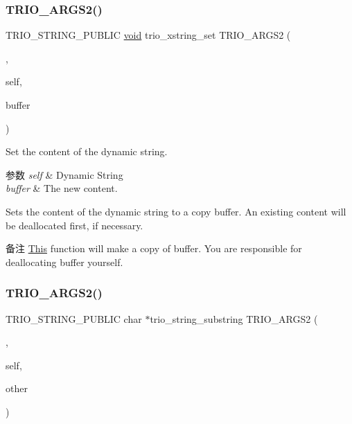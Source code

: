 \subsubsection{\texorpdfstring{T\+R\+I\+O\+\_\+\+A\+R\+G\+S2()}{TRIO\_ARGS2()}\hspace{0.1cm}{\footnotesize\ttfamily [2/3]}}
{\footnotesize\ttfamily T\+R\+I\+O\+\_\+\+S\+T\+R\+I\+N\+G\+\_\+\+P\+U\+B\+L\+IC \hyperlink{interfacevoid}{void} trio\+\_\+xstring\+\_\+set T\+R\+I\+O\+\_\+\+A\+R\+G\+S2 (\begin{DoxyParamCaption}\item[{(self, buffer)}]{,  }\item[{\hyperlink{struct__trio__string__t}{trio\+\_\+string\+\_\+t} $\ast$}]{self,  }\item[{char $\ast$}]{buffer }\end{DoxyParamCaption})}

Set the content of the dynamic string.


\begin{DoxyParams}{参数}
{\em self} & Dynamic String \\
\hline
{\em buffer} & The new content.\\
\hline
\end{DoxyParams}
Sets the content of the dynamic string to a copy {\ttfamily buffer}. An existing content will be deallocated first, if necessary.

\begin{DoxyRemark}{备注}
\hyperlink{namespace_this}{This} function will make a copy of {\ttfamily buffer}. You are responsible for deallocating {\ttfamily buffer} yourself. 
\end{DoxyRemark}
\mbox{\label{group___dynamic_strings_gae667c0eb39eed60b4c2742eb2d5cef5b}} 
\subsubsection{\texorpdfstring{T\+R\+I\+O\+\_\+\+A\+R\+G\+S2()}{TRIO\_ARGS2()}\hspace{0.1cm}{\footnotesize\ttfamily [3/3]}}
{\footnotesize\ttfamily T\+R\+I\+O\+\_\+\+S\+T\+R\+I\+N\+G\+\_\+\+P\+U\+B\+L\+IC char $\ast$trio\+\_\+string\+\_\+substring T\+R\+I\+O\+\_\+\+A\+R\+G\+S2 (\begin{DoxyParamCaption}\item[{(self, other)}]{,  }\item[{\hyperlink{struct__trio__string__t}{trio\+\_\+string\+\_\+t} $\ast$}]{self,  }\item[{\hyperlink{struct__trio__string__t}{trio\+\_\+string\+\_\+t} $\ast$}]{other }\end{DoxyParamCaption})}

